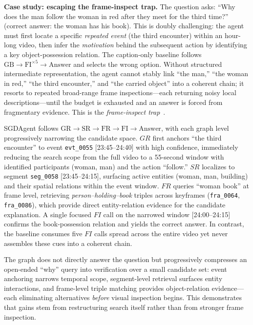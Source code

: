 \documentclass[sigconf, screen, review, anonymous]{acmart}
\begin{document}
\textbf{Case study: escaping the frame-inspect trap.}\quad
The question asks: ``Why does the man follow the woman in red after they
meet for the third time?'' (correct answer: the woman has his book).
This is doubly challenging: the agent must first locate a specific
\emph{repeated event} (the third encounter) within an hour-long video,
then infer the \emph{motivation} behind the subsequent action by
identifying a key object-possession relation.
The caption-only baseline follows
$\text{GB} \!\to\! \text{FI}^{\times 5} \!\to\! \text{Answer}$
and selects the wrong option.  Without structured intermediate
representation, the agent cannot stably link ``the man,'' ``the woman
in red,'' ``the third encounter,'' and ``the carried object'' into a
coherent chain; it resorts to repeated broad-range frame
inspections---each returning noisy local descriptions---until the budget
is exhausted and an answer is forced from fragmentary evidence.  This is
the \emph{frame-inspect trap}~\cite{deepvideo2025}.

SGDAgent follows
$\text{GR} \!\to\! \text{SR} \!\to\! \text{FR} \!\to\!
\text{FI} \!\to\! \text{Answer}$,
with each graph level progressively narrowing the candidate space.
$GR$ first anchors ``the third encounter'' to event
\texttt{evt\_0055} [23:45--24:40] with high confidence, immediately
reducing the search scope from the full video to a 55-second window
with identified participants (woman, man) and the action ``follow.''
$SR$ localizes to segment \texttt{seg\_0058} [23:45--24:15],
surfacing active entities (woman, man, building) and their spatial
relations within the event window.
$FR$ queries ``woman book'' at frame level, retrieving
\emph{person--holding--book} triples across keyframes
(\texttt{fra\_0064}, \texttt{fra\_0086}), which provide direct
entity-relation evidence for the candidate explanation.
A single focused $FI$ call on the narrowed window [24:00--24:15]
confirms the book-possession relation and yields the correct answer.
In contrast, the baseline consumes five $FI$ calls spread across the
entire video yet never assembles these cues into a coherent chain.

The graph does not directly answer the question but progressively
compresses an open-ended ``why'' query into verification over a small
candidate set: event anchoring narrows temporal scope, segment-level
retrieval surfaces entity interactions, and frame-level triple matching
provides object-relation evidence---each eliminating alternatives
\emph{before} visual inspection begins.  This demonstrates that gains
stem from restructuring search itself rather than from stronger frame
inspection.
\end{document}
